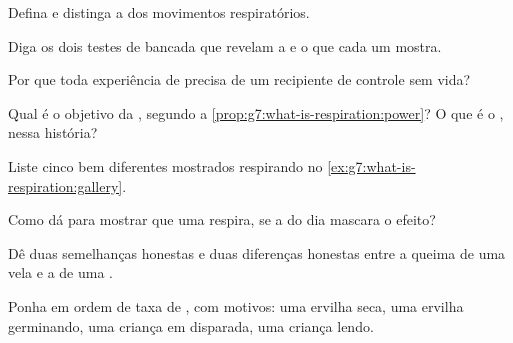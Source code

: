 \begin{exercise}[$\star$]\label{exo:g7:what-is-respiration:1}
Defina  e distinga a  dos movimentos respiratórios.
\end{exercise}

\begin{exercise}[$\star$]\label{exo:g7:what-is-respiration:2}
Diga os dois testes de bancada que revelam a  e o que cada um
mostra.
\end{exercise}

\begin{exercise}[$\star$]\label{exo:g7:what-is-respiration:3}
Por que toda experiência de  precisa de um recipiente de
controle sem vida?
\end{exercise}

\begin{exercise}[$\star$]\label{exo:g7:what-is-respiration:4}
Qual é o objetivo da , segundo a
\cref{prop:g7:what-is-respiration:power}? O que é o ,
nessa história?
\end{exercise}

\begin{exercise}[$\star$]\label{exo:g7:what-is-respiration:5}
Liste cinco  bem diferentes mostrados respirando no
\cref{ex:g7:what-is-respiration:gallery}.
\end{exercise}

\begin{exercise}[$\star$]\label{exo:g7:what-is-respiration:6}
Como dá para mostrar que uma  respira, se a  do dia mascara o
efeito?
\end{exercise}

\begin{exercise}[$\star\star$]\label{exo:g7:what-is-respiration:7}
Dê duas semelhanças honestas e duas diferenças honestas entre a queima
de uma vela e a  de uma .
\end{exercise}

\begin{exercise}[$\star\star$]\label{exo:g7:what-is-respiration:8}
Ponha em ordem de taxa de , com motivos: uma ervilha seca,
uma ervilha germinando, uma criança em disparada, uma criança lendo.
\end{exercise}

